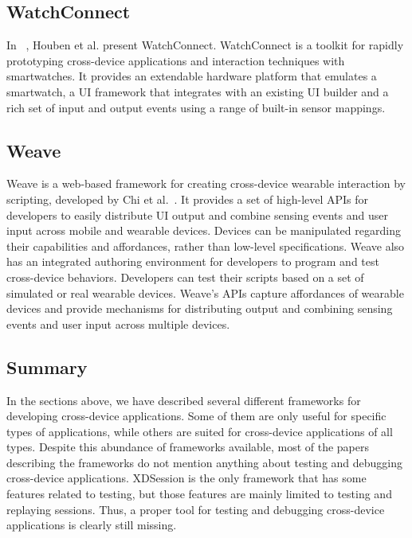 \subsection{WatchConnect}

In ~\cite{watchconnect2015}, Houben et al. present WatchConnect. WatchConnect is a toolkit for rapidly prototyping cross-device applications and interaction techniques with smartwatches. It provides an extendable hardware platform that emulates a smartwatch, a UI framework that integrates with an existing UI builder and a rich set of input and output events using a range of built-in sensor mappings.

\subsection{Weave}

Weave is a web-based framework for creating cross-device wearable interaction by scripting, developed by Chi et al.~\cite{weave2015}. It provides a set of high-level APIs for developers to easily distribute UI output and combine sensing events and user input across mobile and wearable devices. Devices can be manipulated regarding their capabilities and affordances, rather than low-level specifications. Weave also has an integrated authoring environment for developers to program and test cross-device behaviors. Developers can test their scripts based on a set of simulated or real wearable devices. Weave's APIs capture affordances of wearable devices and provide mechanisms for distributing output and combining sensing events and user input across multiple devices.

\subsection{Summary}

In the sections above, we have described several different frameworks for developing cross-device applications. Some of them are only useful for specific types of applications, while others are suited for cross-device applications of all types. Despite this abundance of frameworks available, most of the papers describing the frameworks do not mention anything about testing and debugging cross-device applications. XDSession is the only framework that has some features related to testing, but those features are mainly limited to testing and replaying sessions. Thus, a proper tool for testing and debugging cross-device applications is clearly still missing.